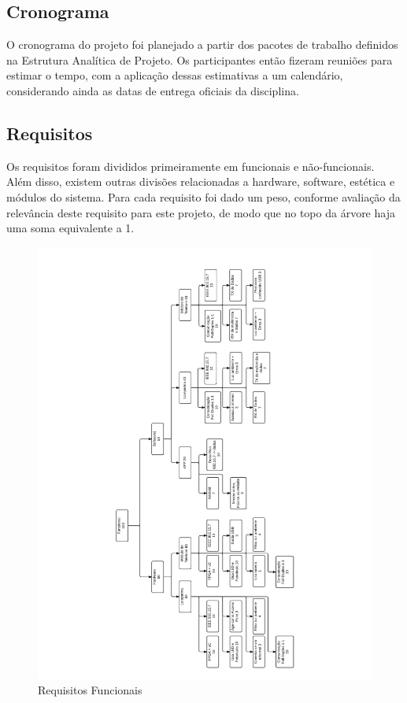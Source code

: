 	\subsection{Cronograma}\label{subsec-cronograma}
	
	O cronograma do projeto foi planejado a partir dos pacotes de trabalho definidos na Estrutura Analítica de Projeto. Os participantes então fizeram reuniões para estimar o tempo, com a aplicação dessas estimativas a um calendário, considerando ainda as datas de entrega oficiais da disciplina.
	
	\subsection{Requisitos}\label{subsec-requisitos}
	
	Os requisitos foram divididos primeiramente em funcionais e não-funcionais. Além disso, existem outras divisões relacionadas a hardware, software, estética e módulos do sistema. Para cada requisito foi dado um peso, conforme avaliação da relevância deste requisito para este projeto, de modo que no topo da árvore haja uma soma equivalente a 1.
	
	\begin{figure}[htb]
		\caption{\label{fig_req1} Requisitos Funcionais }
		\centering
		\includegraphics[width=1.0\textwidth, trim={1cm 1cm 1cm 1cm}, clip]{ReqTree1.pdf}
	\end{figure}
	
